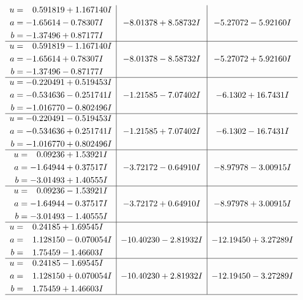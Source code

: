 \documentclass[1p]{elsarticle_modified}
\theoremstyle{definition}
\begin{document}
$$\begin{array}{c|c|c}
\begin{aligned}
u &= \phantom{-}0.591819 + 1.167140 I \\
a &= -1.65614 - 0.78307 I \\
b &= -1.37496 + 0.87177 I\end{aligned}
 & -8.01378 + 8.58732 I & -5.27072 - 5.92160 I \\ \hline\begin{aligned}
u &= \phantom{-}0.591819 - 1.167140 I \\
a &= -1.65614 + 0.78307 I \\
b &= -1.37496 - 0.87177 I\end{aligned}
 & -8.01378 - 8.58732 I & -5.27072 + 5.92160 I \\ \hline\begin{aligned}
u &= -0.220491 + 0.519453 I \\
a &= -0.534636 - 0.251741 I \\
b &= -1.016770 - 0.802496 I\end{aligned}
 & -1.21585 - 7.07402 I & -6.1302 + 16.7431 I \\ \hline\begin{aligned}
u &= -0.220491 - 0.519453 I \\
a &= -0.534636 + 0.251741 I \\
b &= -1.016770 + 0.802496 I\end{aligned}
 & -1.21585 + 7.07402 I & -6.1302 - 16.7431 I \\ \hline\begin{aligned}
u &= \phantom{-}0.09236 + 1.53921 I \\
a &= -1.64944 + 0.37517 I \\
b &= -3.01493 + 1.40555 I\end{aligned}
 & -3.72172 - 0.64910 I & -8.97978 - 3.00915 I \\ \hline\begin{aligned}
u &= \phantom{-}0.09236 - 1.53921 I \\
a &= -1.64944 - 0.37517 I \\
b &= -3.01493 - 1.40555 I\end{aligned}
 & -3.72172 + 0.64910 I & -8.97978 + 3.00915 I \\ \hline\begin{aligned}
u &= \phantom{-}0.24185 + 1.69545 I \\
a &= \phantom{-}1.128150 - 0.070054 I \\
b &= \phantom{-}1.75459 - 1.46603 I\end{aligned}
 & -10.40230 - 2.81932 I & -12.19450 + 3.27289 I \\ \hline\begin{aligned}
u &= \phantom{-}0.24185 - 1.69545 I \\
a &= \phantom{-}1.128150 + 0.070054 I \\
b &= \phantom{-}1.75459 + 1.46603 I\end{aligned}
 & -10.40230 + 2.81932 I & -12.19450 - 3.27289 I\\
 \hline 
 \end{array}$$\newpage\newpage\renewcommand{\arraystretch}{1}
\end{document}
